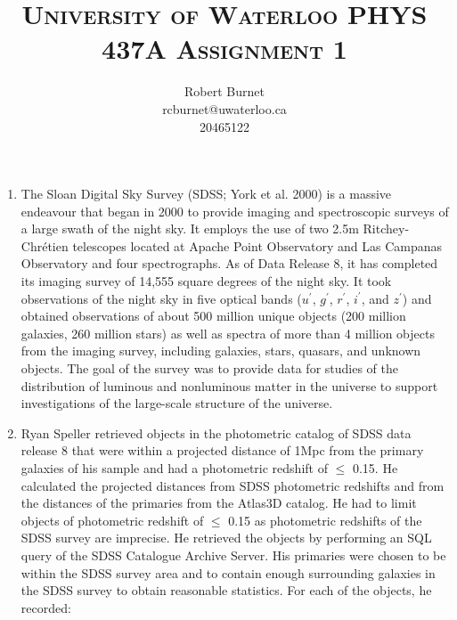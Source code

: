 \documentclass[10pt,letterpaper]{article}
\begin{document}
\title{\scshape\LARGE University of Waterloo \vfill \huge\bfseries PHYS 437A Assignment 1 \vfill}
\author{Robert Burnet \\ rcburnet@uwaterloo.ca \\ 20465122 }
\maketitle

\newpage

\begin{enumerate}
\item The Sloan Digital Sky Survey (SDSS; York et al. 2000) \cite{SDSS} is a massive endeavour that began in 2000 to provide imaging and spectroscopic surveys of a large swath of the night sky. It employs the use of two 2.5m Ritchey-Chr\'etien telescopes located at Apache Point Observatory and Las Campanas Observatory and four spectrographs.\cite{instruments} As of Data Release 8, it has completed its imaging survey of 14,555 square degrees of the night sky.\cite{DR8} It took observations of the night sky in five optical bands ($u^\prime$, $g^\prime$, $r^\prime$, $i^\prime$, and $z^\prime$) and obtained observations of about 500 million unique objects (200 million galaxies, 260 million stars) as well as spectra of more than 4 million objects from the imaging survey, including galaxies, stars, quasars, and unknown objects.\cite{scope} The goal of the survey was to provide data for studies of the distribution of luminous and nonluminous matter in the universe to support investigations of the large-scale structure of the universe.

\item Ryan Speller retrieved objects in the photometric catalog of SDSS data release 8 that were within a projected distance of 1Mpc from the primary galaxies of his sample and had a photometric redshift of $\leq$ 0.15. He calculated the projected distances from SDSS photometric redshifts and from the distances of the primaries from the Atlas3D catalog. He had to limit objects of photometric redshift of $\leq$ 0.15 as photometric redshifts of the SDSS survey are imprecise. He retrieved the objects by performing an SQL query of the SDSS Catalogue Archive Server. His primaries were chosen to be within the SDSS survey area and to contain enough surrounding galaxies in the SDSS survey to obtain reasonable statistics. For each of the objects, he recorded:


\end{enumerate}
\end{document}
